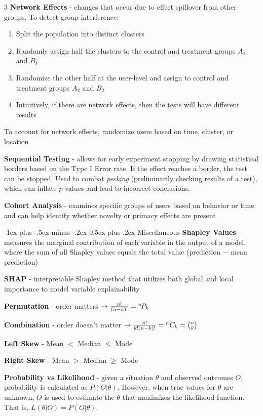 \documentclass[10pt,landscape,letterpaper]{article}
\makeatletter
\renewcommand{\section}{\@startsection{section}{1}{0mm}%
                                {-1ex plus -.5ex minus -.2ex}%
                                {0.5ex plus .2ex}%
                                {\normalfont\large\bfseries}}
\makeatother
\begin{document}
\begin{multicols}{3}
\textbf{Network Effects} - changes that occur due to effect spillover from other groups. To detect group interference:
\begin{enumerate}[leftmargin=5mm]
    \itemsep -.4mm
    \item Split the population into distinct clusters
    \item Randomly assign half the clusters to the control and treatment groups $A_1$ and $B_1$
    \item Randomize the other half at the user-level and assign to control and treatment groups
    $A_2$ and $B_2$
    \item Intuitively, if there are network effects, then the tests will have different results
\end{enumerate}
To account for network effects, randomize users based on time, cluster, or location
\smallskip

\textbf{Sequential Testing} - allows for early experiment stopping by drawing statistical borders based on the Type I Error rate. If the effect reaches a border, the test can be stopped. Used to combat \emph{peeking} (preliminarily checking results of a test), which can inflate $p$-values and lead to incorrect conclusions.

\textbf{Cohort Analysis} - examines specific groups of users based on behavior or time and can help identify whether novelty or primacy effects are present

\section{Miscellaneous}
\textbf{Shapley Values} - measures the marginal contribution of each variable in the output of a model, where the sum of all Shapley values equals the total value (prediction $-$ mean prediction)

\textbf{SHAP} - interpretable Shapley method that utilizes both global and local importance to model variable explainability

\textbf{Permutation} - order matters  $\to \frac{n!}{(n-k)!} = {}^{n}\!P_{k}$

\textbf{Combination} - order doesn't matter $\to \frac{n!}{k!(n-k)!}= {}^{n}C_{k}= \binom nk$

\textbf{Left Skew} - Mean $<$ Median $\leq$ Mode

\textbf{Right Skew} - Mean $>$ Median $\geq$ Mode

\textbf{Probability vs Likelihood} - given a situation $\theta$ and observed outcomes $O$, probability is calculated as $P(O|\theta)$. However, when true values for $\theta$ are unknown, $O$ is used to estimate the $\theta$ that maximizes the likelihood function. That is, $L(\theta|O) = P(O|\theta)$.
\newpage
\end{multicols}
\end{document}
